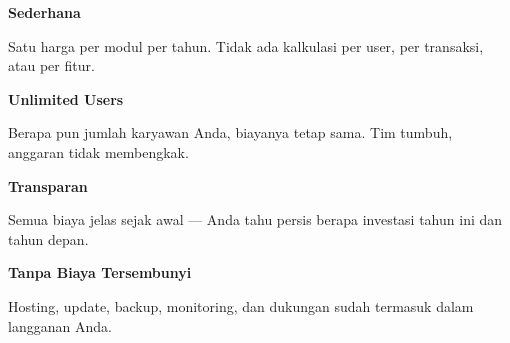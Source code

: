 \documentclass[a4paper]{article}
\begin{document}
\noindent
\begin{minipage}[t]{0.485\textwidth}
    \noindent\colorbox{BlueBg}{%
        \begin{minipage}[t][2.7cm][c]{\dimexpr\linewidth-2\fboxsep\relax}
            \centering
            {\fontsize{14}{18}\selectfont\bfseries\color{BluePrimary} Sederhana}\par\vspace{3pt}
            {\fontsize{8.5}{11}\selectfont\color{TextDark}Satu harga per modul per tahun. Tidak ada kalkulasi per user, per transaksi, atau per fitur.}
        \end{minipage}}\par
    \vspace{6pt}
    \noindent\colorbox{BlueBg}{%
        \begin{minipage}[t][2.7cm][c]{\dimexpr\linewidth-2\fboxsep\relax}
            \centering
            {\fontsize{14}{18}\selectfont\bfseries\color{BluePrimary} Unlimited Users}\par\vspace{3pt}
            {\fontsize{8.5}{11}\selectfont\color{TextDark}Berapa pun jumlah karyawan Anda, biayanya tetap sama. Tim tumbuh, anggaran tidak membengkak.}
        \end{minipage}}%
\end{minipage}%
\hfill
\begin{minipage}[t]{0.485\textwidth}
    \noindent\colorbox{BlueBg}{%
        \begin{minipage}[t][2.7cm][c]{\dimexpr\linewidth-2\fboxsep\relax}
            \centering
            {\fontsize{14}{18}\selectfont\bfseries\color{BluePrimary} Transparan}\par\vspace{3pt}
            {\fontsize{8.5}{11}\selectfont\color{TextDark}Semua biaya jelas sejak awal --- Anda tahu persis berapa investasi tahun ini dan tahun depan.}
        \end{minipage}}\par
    \vspace{6pt}
    \noindent\colorbox{BlueBg}{%
        \begin{minipage}[t][2.7cm][c]{\dimexpr\linewidth-2\fboxsep\relax}
            \centering
            {\fontsize{14}{18}\selectfont\bfseries\color{BluePrimary} Tanpa Biaya Tersembunyi}\par\vspace{3pt}
            {\fontsize{8.5}{11}\selectfont\color{TextDark}Hosting, update, backup, monitoring, dan dukungan sudah termasuk dalam langganan Anda.}
        \end{minipage}}%
\end{minipage}
\end{document}
